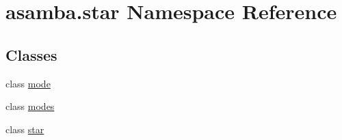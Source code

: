 \hypertarget{namespaceasamba_1_1star}{}\section{asamba.\+star Namespace Reference}
\label{namespaceasamba_1_1star}
\subsection*{Classes}
\begin{DoxyCompactItemize}
\item 
class \hyperlink{classasamba_1_1star_1_1mode}{mode}
\item 
class \hyperlink{classasamba_1_1star_1_1modes}{modes}
\item 
class \hyperlink{classasamba_1_1star_1_1star}{star}
\end{DoxyCompactItemize}
